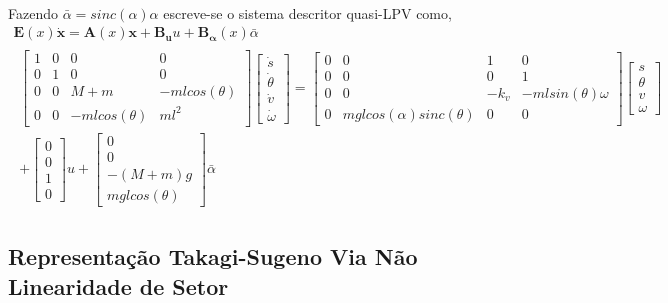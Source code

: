 \documentclass[a4paper,10pt]{article}
\begin{document}
\paragraph{} Fazendo $\bar{\alpha} = sinc(\alpha)\alpha$ escreve-se o sistema descritor quasi-LPV como,
\begin{gather}
	\bm{E}(x)\dot{\bm{x}} = \bm{A}(x)\bm{x} + \bm{B_u}u + \bm{B_\alpha}(x)\bar{\alpha} \\
		\begin{split}
		\begin{bmatrix}
			1 & 0 & 0 & 0 \\
			0 & 1 & 0 & 0 \\
			0 & 0 & M+m & -mlcos(\theta) \\
			0 & 0 & -mlcos(\theta) & ml^2
		\end{bmatrix}\begin{bmatrix}
			\dot{s} \\ \dot{\theta} \\ \dot{v} \\ \dot{\omega}
		\end{bmatrix} = \begin{bmatrix}
			0 & 0 & 1 & 0 \\
			0 & 0 & 0 & 1 \\
			0 & 0 & -k_v & -mlsin(\theta)\omega \\
			0 & mglcos(\alpha)sinc(\theta) & 0 & 0
		\end{bmatrix}\begin{bmatrix}
			s \\ \theta \\ v \\ \omega
		\end{bmatrix} \\
		+ \begin{bmatrix}
			0 \\ 0 \\ 1 \\ 0
		\end{bmatrix}u + \begin{bmatrix}
			0 \\ 0 \\ -(M+m)g \\ mglcos(\theta)
		\end{bmatrix}\bar{\alpha}
	\end{split}
\end{gather}


\subsection{Representação Takagi-Sugeno Via Não Linearidade de Setor}
\end{document}

